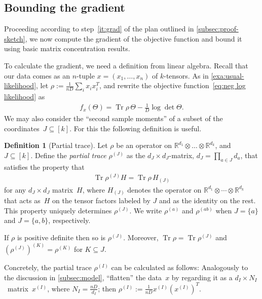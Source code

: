 \documentclass[aos]{imsart}
\theoremstyle{definition}
\newtheorem{definition}[theorem]{Definition}
\numberwithin{equation}{section}
\DeclareMathOperator{\tr}{Tr}
\newcommand{\R}{{\mathbb{R}}}
\newcommand{\ot}{\otimes}
\begin{document}
\subsection{Bounding the gradient}
Proceeding according to step~\ref{it:grad} of the plan outlined in \cref{subsec:proof-sketch}, we now compute the gradient of the objective function and bound it using basic matrix concentration results.

To calculate the gradient, we need a definition from linear algebra.
Recall that our data comes as an $n$-tuple $x=(x_1,\dots,x_n)$ of $k$-tensors. %
As in \cref{exa:usual-likelihood}, let $\rho := \frac1{nD}\sum_i x_i x_i^T$, and rewrite the objective function~\eqref{eq:neg log likelihood} as
\begin{align}\label{eq:obj via rho}
  f_x(\Theta) = \tr \rho \, \Theta - \frac1D \log \det \Theta.
\end{align}
We may also consider the ``second sample moments'' of a subset of the coordinates~$J \subseteq [k]$.
For this the following definition is useful.

\begin{definition}[Partial trace]\label{definition:partial-trace}
Let $\rho$ be an operator on $\R^{d_1} \ot \dots \ot \R^{d_k}$, and~$J \subseteq [k]$.
Define the \emph{partial trace} $\rho^{(J)}$ as the $d_J \times d_J$-matrix, $d_J = \prod_{a\in J} d_a$, that satisfies the property that
\begin{align}\label{eq:partial trace duality}
  \tr \rho^{(J)} H
= \tr \rho \, H_{(J)}
\end{align}
for any $d_J\times d_J$ matrix~$H$, where $H_{(J)}$ denotes the operator on $\R^{d_1} \ot \cdots \ot \R^{d_k}$ that acts as~$H$ on the tensor factors labeled by $J$ and as the identity on the rest.
This property uniquely determines $\rho^{(J)}$.
We write $\rho^{(a)}$ and $\rho^{(ab)}$ when $J=\{a\}$ and $J=\{a,b\}$, respectively.


If $\rho$ is positive definite then so is $\rho^{(J)}$.
Moreover, $\tr \rho = \tr \rho^{(J)}$ and $(\rho^{(J)})^{(K)} = \rho^{(K)}$ for $K \subseteq J$.
\end{definition}

Concretely, the partial trace $\rho^{(I)}$ can be calculated as follows:
Analogously to the discussion in \cref{subsec:model}, ``flatten'' the data~$x$ by regarding it as a $d_I \times N_I$~matrix~$x^{(I)}$, where $N_I = \frac{nD}{d_I}$;
then $\rho^{(I)} := \frac1{nD} x^{(I)} (x^{(I)})^T$.
\end{document}
